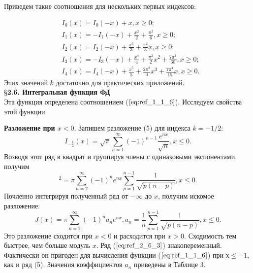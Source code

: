 Приведем такие соотношения для нескольких первых индексов:

\begin{equation}
\begin{aligned}
&I_0(x)=I_0(-x)+x,x \geqslant 0; \\
&I_1(x)=-I_1(-x)+\frac{x^2}{2} + \frac{\pi^2}{6},x \geqslant 0;\\
&I_2(x)=I_2(-x)+\frac{x^3}{3} + \frac{\pi^2}{3}x,x \geqslant 0;\\
&I_3(x)=-I_3(-x)+\frac{x^4}{4} + \frac{\pi^2}{2}x^2 + \frac{7\pi^4}{60},x \geqslant 0;\\
&I_4(x)=I_4(-x)+\frac{x^5}{5} + \frac{2\pi^2}{3}x^3 + \frac{7\pi^4}{15}x,x \geqslant 0.
\end{aligned}
\label{eq:ref_2_5_4}
\end{equation}
Этих значений $k$ достаточно для практических приложений.
\\

\S \textbf{2.6. Интегральная функция ФД}
\\

Эта функция определена соотношением ($\ref{eq:ref_1_1_6}$). Исследуем свойства этой функции.

\textbf{Разложение при $x < 0.$} Запишем разложение (5) для индекса $k=-1/2$:
\begin{equation}
I_{-\frac{1}{2}}(x)=\sqrt{\pi} \sum\limits_{n=1}^{\infty} (-1)^{n-1} \frac{e^{nx}}{\sqrt{n}},x \leqslant 0.
\label{eq:ref_2_6_1}
\end{equation}
Возводя этот ряд в квадрат и группируя члены с одинаковыми экспонентами, получим
\begin{equation}
[I_{-\frac{1}{2}}(x)]^2 = \pi \sum\limits_{n=2}^{\infty} (-1)^n e^{nx} \sum\limits_{p=1}^{n-1} \frac{1}{\sqrt{p(n-p)}},x \leqslant 0.
\label{eq:ref_2_6_2}
\end{equation}
Почленно интегрируя полученный ряд от $-\infty$ до $x$, получим искомое
разложение:
\begin{equation}
J(x) = \pi \sum\limits_{n=2}^{\infty} (-1)^n a_n e^{nx}, a_n = \frac{1}{n} \sum_{p=1}^{n-1} \frac{1}{\sqrt{p(n-p)}}, x \leqslant 0.
\label{eq:ref_2_6_3}
\end{equation}
Это разложение сходится при $x < 0$ и расходится при $x > 0$. Сходимость тем
быстрее, чем больше модуль $x$. Ряд ($\ref{eq:ref_2_6_3}$) знакопеременный. Фактически он
пригоден для вычисления функции ($\ref{eq:ref_1_1_6}$) при $х \leqslant -1$, как и ряд (5). Значения
коэффициентов $a_n$ приведены в Таблице 3.

